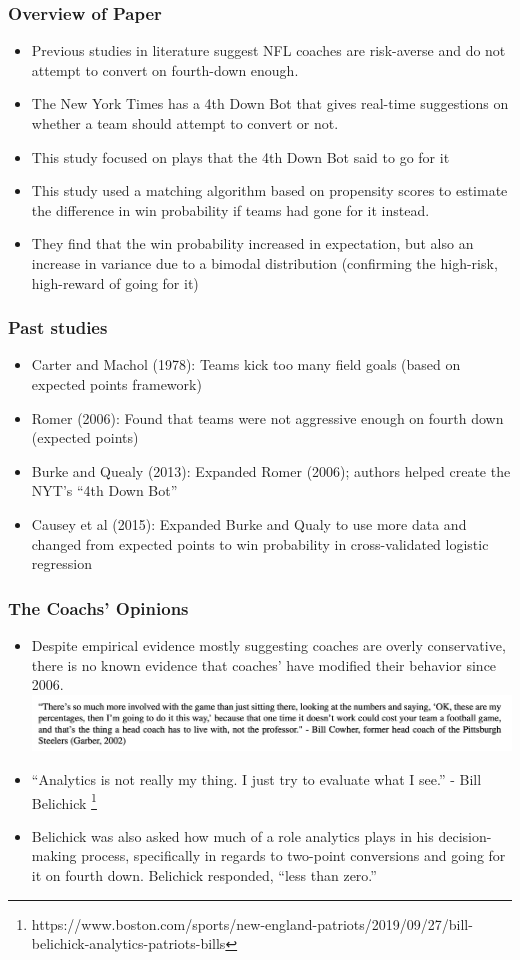 \documentclass[t]{beamer}
\begin{document}
\begin{frame}
  \frametitle{Overview of Paper}
  \begin{itemize}
  \item Previous studies in literature suggest NFL coaches are risk-averse and do not attempt to convert on fourth-down enough.
  \item The New York Times has a 4th Down Bot that gives real-time suggestions on whether a team should attempt to convert or not.
  \item This study focused on plays that the 4th Down Bot said to go for it  \item This study used a matching algorithm based on propensity scores to estimate the difference in win probability if teams had gone for it instead.
   \item They find that the win probability increased in expectation, but also an increase in variance due to a bimodal distribution (confirming the high-risk, high-reward of going for it)
  \end{itemize}
\end{frame}

\begin{frame}
  \frametitle{Past studies}
  \begin{itemize}
  \item Carter and Machol (1978): Teams kick too many field goals (based on
    expected points framework)
  \item Romer (2006): Found that teams were not aggressive enough on fourth down (expected points)
  \item Burke and Quealy (2013): Expanded Romer (2006); authors helped create the NYT's ``4th Down Bot''
  \item Causey et al (2015): Expanded Burke and Qualy to use more data and changed from expected points to win probability in cross-validated logistic regression
  \end{itemize}
\end{frame}

\begin{frame}
  \frametitle{The Coachs' Opinions}
  \begin{itemize}
  \item Despite empirical evidence mostly suggesting coaches are overly conservative, there is no known evidence that coaches' have modified their behavior since 2006.
  \includegraphics[width=\linewidth]{./cowher.png}
\item ``Analytics is not really my thing. I just try to evaluate what I see.'' - Bill Belichick \footnote{https://www.boston.com/sports/new-england-patriots/2019/09/27/bill-belichick-analytics-patriots-bills}
\item Belichick was also asked how much of a role analytics plays in his decision-making process, specifically in regards to two-point conversions and going for it on fourth down. Belichick responded, “less than zero.”
  \end{itemize}
\end{frame}
\end{document}
